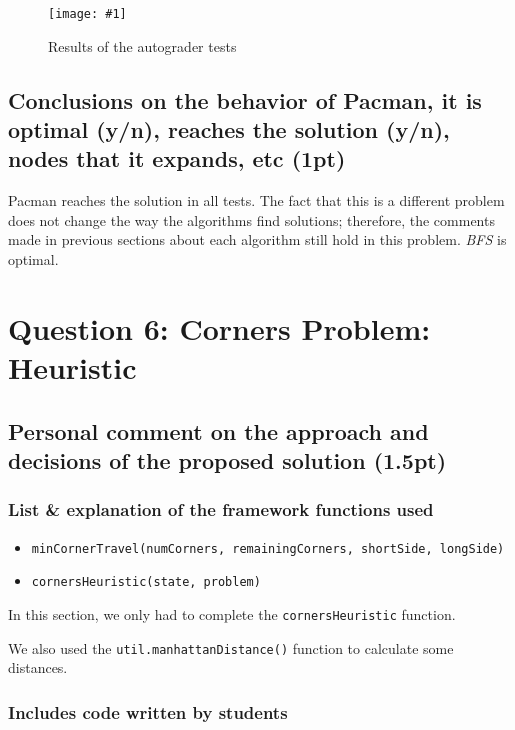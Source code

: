 \documentclass{article}
\newcommand{\myFigure}[4]{%
    \begin{figure}[H]
        \texttt{[image: \#1]}
        \centering
        \caption{#2}
        \label{#3}
    \end{figure}
}
\begin{document}
\myFigure{./img/ex5/test5}{Results of the autograder tests}{test5}{.7}


\subsection{Conclusions on the behavior of Pacman, it is optimal (y/n), reaches the solution (y/n), nodes that it expands, etc (1pt)}

Pacman reaches the solution in all tests. The fact that this is a different problem does not change the way the algorithms find solutions; therefore, the comments made in previous sections about each algorithm still hold in this problem. \emph{BFS} is optimal.



\pagebreak
\section{Question 6: Corners Problem: Heuristic}

\subsection{Personal comment on the approach and decisions of the proposed solution (1.5pt)}

\subsubsection{List \& explanation of the framework functions used}

\begin{itemize}
    \item \texttt{minCornerTravel(numCorners, remainingCorners, shortSide, longSide)}
    \item \texttt{cornersHeuristic(state, problem)}
\end{itemize}

In this section, we only had to complete the \texttt{cornersHeuristic} function. 

We also used the \texttt{util.manhattanDistance()} function to calculate some distances. 

\subsubsection{Includes code written by students}
\end{document}
